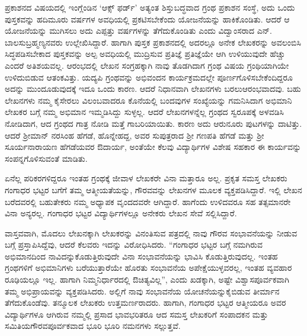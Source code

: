 {ಪ್ರಕಾಶನದ ವಿಷಯದಲ್ಲಿ ಇಂಗ್ಲೆಂಡಿನ ‘ಆಕ್ಸ್ ಫರ್ಡ್’ \enginline{-} ಅತ್ಯಂತ ಶಿಸ್ತುಬದ್ಧವಾದ ಗ್ರಂಥ ಪ್ರಕಾಶನ ಸಂಸ್ಥೆ, ಅದು ಒಂದು ಪುಸ್ತಕವನ್ನು ಹದಿಮೂರು ವರ್ಷಗಳ ಅವಧಿಯಲ್ಲಿ ಪ್ರಕಟಿಸಬೇಕೆಂದು ಯೋಜನೆಯನ್ನು ಹಾಕಿಕೊಂಡಿತು. ಆದರೆ ಆ ಯೋಜನೆಯನ್ನು ಮುಗಿಸಲು ಅದು ಎಪ್ಪತ್ತು ವರ್ಷಗಳನ್ನು ತೆಗೆದುಕೊಂಡಿತು ಎಂದು ವಿದ್ವಾಂಸರಾದ ಎನ್. ಬಾಲಸುಬ್ರಹ್ಮಣ್ಯನವರು ಉಲ್ಲೇಖಿಸಿದ್ದಾರೆ. ಹಾಗಾಗಿ ಪುಸ್ತಕ ಪ್ರಕಾಶನದಲ್ಲಿ ಅದರಲ್ಲೂ ಅನೇಕ ಲೇಖಕರನ್ನು ಅವಲಂಬಿಸಿ ಸಿದ್ಧಪಡಿಸಬೇಕಾದ ಪುಸ್ತಕವನ್ನು  ಅಲ್ಪ  ಅವಧಿಯಲ್ಲಿ ಮುದ್ರಿಸುವ ಪ್ರತಿಜ್ಞೆ ಪ್ರತಿಜ್ಞೆಯೇ ಆಗಿ \hbox{ಉಳಿಯುವುದೇ} ಹೆಚ್ಚು ಎಂದರೆ ಅತಿಶಯವಲ್ಲ. 
ಆರಂಭದಲ್ಲಿ ಲೇಖನ ಸಂಗ್ರಹಕ್ಕಾಗಿ ನಾವು ತೊಡಗಿದಾಗ ಗ್ರಂಥ ವಿಷಯ ಗ್ರಂಥಿಯಾಗಿಯೇ ಉಳಿದುಬಿಡುವ ಆತಂಕವಿತ್ತು. ಯದ್ಯಪಿ ಗ್ರಂಥವನ್ನು ಅಭಿವಂದನ ಕಾರ್ಯಕ್ರಮದಲ್ಲೇ ಪೂರ್ಣಗೊಳಿಸಬೇಕೆಂದಿದ್ದರೂ ಅದನ್ನು ಮುಂದೂಡುವುದಕ್ಕೆ ಇದೂ ಒಂದು ಕಾರಣ. ಆದರೆ ನಿಧಾನವಾಗಿ ಲೇಖನಗಳು ಬರಲು\break ಆರಂಭವಾದವು. ಬಹು ಲೇಖನಗಳು ನಮ್ಮ ಕೈಸೇರಲು ವಿಲಂಬವಾದರೂ ಕೊನೆಯಲ್ಲಿ ಬಂದವುಗಳ ಸಂಖ್ಯೆಯನ್ನು ಗಮನಿಸಿದಾಗ ಅಭಿಮಾನಿ ಲೇಖಕರ ಬಗ್ಗೆ ನಮ್ಮ ಅಭಿಮಾನ ಇಮ್ಮಡಿಸಿದ್ದು ಸುಳ್ಳಲ್ಲ. ಆದರೆ ಲೇಖನಗಳನ್ನೆಲ್ಲ ಗ್ರಂಥದ ಸ್ವರೂಪಕ್ಕೆ  ಅಳವಡಿಸಿ ನೋಡಿದಾಗ, ಆದ ಗ್ರಂಥದ ಗಾತ್ರ ನೋಡಿ ಮತ್ತೆ ಗಾಬರಿಯಾಯಿತು. ಕಾರಣ ಅದು ಆರುನೂರು ಪುಟಗಳನ್ನು ದಾಟಿತ್ತು. ಆದರೆ ಶ್ರೀಮಾನ್ ನರಸಿಂಹ ಹೆಗಡೆ, ಹೊನ್ನೇಹದ್ದ,  ಅವರ ಸುಪುತ್ರರಾದ ಶ್ರೀ ಗಣಪತಿ ಹೆಗಡೆ ಮತ್ತು ಶ್ರೀ ಸೂರ್ಯ\break ನಾರಾಯಣ ಹೆಗಡೆಯವರ ಔದಾರ್ಯ, ಅಂತೆಯೇ ಕೆಲವು ವಿದ್ಯಾರ್ಥಿಗಳ ವಿಶೇಷ ಸಹಕಾರ  ಈ ಕಾರ್ಯವನ್ನು ಸಂಪನ್ನಗೊಳಿಸುವಂತೆ ಮಾಡಿತು.


ಏನೆಲ್ಲ ಪರಿಕರಗಳಿದ್ದರೂ ಇಂತಹ ಗ್ರಂಥಕ್ಕೆ ಜೀವಾಳ ಲೇಖಕರೇ ವಿನಾ ಮತ್ತಾರೂ ಅಲ್ಲ. ಪ್ರಕೃತ  ಸಮಸ್ತ ಲೇಖಕರು ಗಂಗಾಧರ ಭಟ್ಟರ ಬಗೆಗೆ ತಮ್ಮ ಆತ್ಮೀಯತೆಯನ್ನು, ಗೌರವವನ್ನು ಲೇಖನಗಳ ಮೂಲಕ ವ್ಯಕ್ತಪಡಿಸಿದ್ದಾರೆ. ಇಲ್ಲಿ ಲೇಖನ ಬರೆದವರಲ್ಲಿ ಬಹುತೇಕರು ನಮ್ಮ ಅಧ್ಯಾಪಕ ವೃಂದದವರೇ ಆಗಿದ್ದಾರೆ. ಹಾಗೆಂದು ಉಳಿದವರೂ ಸಹ ತತ್ಸಮಾನರೇ ವಿನಾ ಅನ್ಯರಲ್ಲ. ಗಂಗಾಧರ ಭಟ್ಟರ ವಿದ್ಯಾರ್ಥಿಗಳಲ್ಲೂ ಅನೇಕರು ಲೇಖನ ಸೇವೆ ಸಲ್ಲಿಸಿದ್ದಾರೆ.

ವಾಸ್ತವವಾಗಿ, ಮೊದಲು ಲೇಖನಕ್ಕಾಗಿ ಲೇಖಕರನ್ನು ವಿನಂತಿಸುವ ಪತ್ರದಲ್ಲಿ ನಾವು ಗೌರವ ಸಂಭಾವನೆಯನ್ನು ನೀಡುವ ಬಗ್ಗೆ ಪ್ರಸ್ತಾಪಿಸಿದ್ದೆವು, ಆದರೆ ಕೆಲವರು ಇದನ್ನು ವಿರೋಧಿಸಿದರು. “ಗಂಗಾಧರ ಭಟ್ಟರ ಬಗ್ಗೆ ನಮಗಿರುವ ಅಭಿಮಾನದಿಂದ ನಾವಿದನ್ನು\break ಕೊಡುತ್ತಿರುವುದೇ ವಿನಾ ಸಂಭಾವನೆಯನ್ನು ಭಾವಿಸಿ ಕೊಡುತ್ತಿರುವುದಲ್ಲ. ಇಂತಹ \hbox{ಗ್ರಂಥಗಳಿಗೆ} ಅಭಿಮಾನಿಗಳು ಬರೆಯುತ್ತಾರೆಯೇ ಹೊರತು ಸಂಭಾವನೆಯ ಅಪೇಕ್ಷೆಯುಳ್ಳವರಲ್ಲ, ಇಂತಹ ವ್ಯವಹಾರ ರೂಢಿಯಲ್ಲೂ ಇಲ್ಲ. ಹಾಗಾಗಿ ನಿಮ್ಮ\break ನಿರ್ಧಾರದಲ್ಲಿ ಔಚಿತ್ಯವಿಲ್ಲ”, ಎಂದು ಖಡಕ್ಕಾಗಿ, ಅಷ್ಟೇ ವಿಶ್ವಾಸಪೂರ್ವಕವಾಗಿ ತಮ್ಮ ಅಭಿಪ್ರಾಯವನ್ನು ವ್ಯಕ್ತಪಡಿಸಿದರು. ಅಲ್ಲಿಗೆ ನಾವು ಸಂಭಾವನೆಯ ಯೋಚನೆಯನ್ನು\break ಕೈಬಿಡುವ ತೀರ್ಮಾನ ತೆಗೆದುಕೊಂಡೆವು. ತನ್ಮೂಲಕ ಲೇಖಕರು ಉತ್ತಮರ್ಣರಾದರು. ಹಾಗಾಗಿ, ಗಂಗಾಧರ ಭಟ್ಟರ ಆತ್ಮೀಯರೂ ಅವರ ವಿದ್ಯಾರ್ಥಿಗಳೂ ಆಗಿರುವ ನಮ್ಮಲ್ಲಿ ಪ್ರಸಾದ ಭಾವಭರಿತರೂ ಆದ ಸಮಸ್ತ ಲೇಖಕರಿಗೆ ಸಂಪಾದಕನ ಮತ್ತು ಸಮಿತಿಯ\break ಗೌರವಪೂರ್ವಕವಾದ ಭೂರಿ ಭೂರಿ ನಮನಗಳು ಸಲ್ಲುತ್ತವೆ.


}
